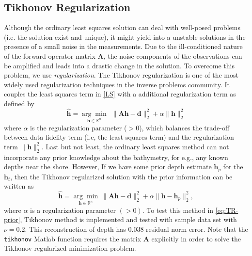 \subsection{ Tikhonov Regularization}

Although the ordinary least squares solution can deal with well-posed problems (i.e. the solution exist and unique), it might yield into a unstable solutions in the presence of a small noise in the measurements. Due to the ill-conditioned nature of the forward operator matrix $\mathbf{A}$, the noise components of the observations can be amplified and leads into a drastic change in the solution. To overcome this problem, we use \textit{regularization}. The Tikhonov regularization is one of the most widely used regularization techniques in the inverse problems community. It couples the least squares term in \eqref{LS} with a additional regularization term as defined by 
\begin{equation}\label{eq:TR}
\mathbf{\hat{h}} = \underset{\mathbf{h} \in \mathbb{R}^n}{\arg \min} \ \ \|  \mathbf{A}\mathbf{h} -  \mathbf{d} \|_2^2  +  \alpha \| \mathbf{h}\|_2^2
\end{equation}
where $\alpha$ is the regularization parameter ($>0$), which balances the trade-off between data fidelity term (i.e, the least squares term) and the regularization term $\| \mathbf{h}\|_2^2$. %
Last but not least, the ordinary least squares method can not incorporate any prior knowledge about the bathymetry, for e.g., any known depths near the shore. However, If we have  some prior depth estimate $\mathbf{h}_p$ for the $\mathbf{h}_t$, then the Tikhonov regularized solution with the prior information can be written as
\begin{equation}\label{eq:TR-prior}
\mathbf{\hat{h}} = \underset{\mathbf{h} \in \mathbb{R}^n}{\arg \min} \  \|  \mathbf{A}\mathbf{h} -  \mathbf{d} \|_2^2  +  \alpha \| \mathbf{h} -  \mathbf{h}_p\|_2^2,
\end{equation}
where $\alpha$ is a regularization parameter $(>0)$. To test this method in \eqref{eq:TR-prior}, Tikhonov method is implemented and tested with sample data set with $\nu = 0.2$. This reconstruction of depth has 0.038 residual norm error. Note that the \verb|tikhonov| Matlab function requires the matrix $\mathbf{A}$ explicitly in order to solve the Tikhonov regularized minimization problem. 


